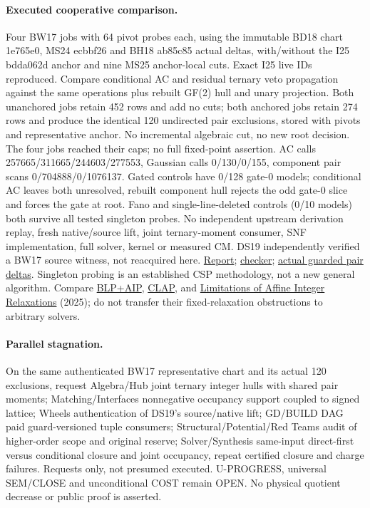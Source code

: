 \documentclass[11pt]{article}
\begin{document}
\paragraph{Executed cooperative comparison.}
Four BW17 jobs with 64 pivot probes each, using the immutable BD18 chart 1e765e0, MS24 ecbbf26 and BH18 ab85c85 actual deltas, with/without the I25 bdda062d anchor and nine MS25 anchor-local cuts. Exact I25 live IDs reproduced. Compare conditional AC and residual ternary veto propagation against the same operations plus rebuilt GF(2) hull and unary projection. Both unanchored jobs retain 452 rows and add no cuts; both anchored jobs retain 274 rows and produce the identical 120 undirected pair exclusions, stored with pivots and representative anchor. No incremental algebraic cut, no new root decision. The four jobs reached their caps; no full fixed-point assertion. AC calls 257665/311665/244603/277553, Gaussian calls 0/130/0/155, component pair scans 0/704888/0/1076137. Gated controls have 0/128 gate-0 models; conditional AC leaves both unresolved, rebuilt component hull rejects the odd gate-0 slice and forces the gate at root. Fano and single-line-deleted controls (0/10 models) both survive all tested singleton probes. No independent upstream derivation replay, fresh native/source lift, joint ternary-moment consumer, SNF implementation, full solver, kernel or measured CM. DS19 independently verified a BW17 source witness, not reacquired here.
\href{https://github.com/j15marti/pnp/commit/a72663d343b642491ae2ca608b7271720db49d56}{Report}; \href{https://github.com/j15marti/pnp/commit/5c44a3fdb604be0b630b27eabcde3f0153f9974f}{checker}; \href{https://github.com/j15marti/pnp/commit/ee97e4fb999b380ca981c892ce6913369b5e574a}{actual guarded pair deltas}. Singleton probing is an established CSP methodology, not a new general algorithm. Compare \href{https://doi.org/10.1137/20M1312745}{BLP+AIP}, \href{https://doi.org/10.1137/22M1476435}{CLAP}, and \href{https://doi.org/10.4230/LIPIcs.ICALP.2025.166}{Limitations of Affine Integer Relaxations} (2025); do not transfer their fixed-relaxation obstructions to arbitrary solvers.
\paragraph{Parallel stagnation.}
On the same authenticated BW17 representative chart and its actual 120 exclusions, request Algebra/Hub joint ternary integer hulls with shared pair moments; Matching/Interfaces nonnegative occupancy support coupled to signed lattice; Wheels authentication of DS19's source/native lift; GD/BUILD DAG paid guard-versioned tuple consumers; Structural/Potential/Red Teams audit of higher-order scope and original reserve; Solver/Synthesis same-input direct-first versus conditional closure and joint occupancy, repeat certified closure and charge failures. Requests only, not presumed executed. U-PROGRESS, universal SEM/CLOSE and unconditional COST remain OPEN. No physical quotient decrease or public proof is asserted.
\end{document}
